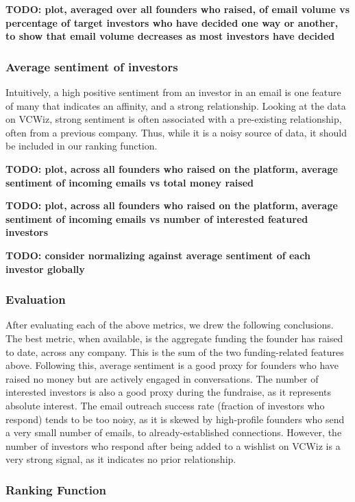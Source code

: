 \textbf{TODO: plot, averaged over all founders who raised, of email volume vs percentage of target investors who have decided one way or another, to show that email volume decreases as most investors have decided}

\subsubsection{Average sentiment of investors}

Intuitively, a high positive sentiment from an investor in an email is one feature of many that indicates an affinity, and a strong relationship. Looking at the data on VCWiz, strong sentiment is often associated with a pre-existing relationship, often from a previous company. Thus, while it is a noisy source of data, it should be included in our ranking function.

\textbf{TODO: plot, across all founders who raised on the platform, average sentiment of incoming emails vs total money raised}

\textbf{TODO: plot, across all founders who raised on the platform, average sentiment of incoming emails vs number of interested featured investors}

\textbf{TODO: consider normalizing against average sentiment of each investor globally}

\medskip

\subsubsection{Evaluation}

After evaluating each of the above metrics, we drew the following conclusions. The best metric, when available, is the aggregate funding the founder has raised to date, across any company. This is the sum of the two funding-related features above. Following this, average sentiment is a good proxy for founders who have raised no money but are actively engaged in conversations. The number of interested investors is also a good proxy during the fundraise, as it represents absolute interest. The email outreach success rate (fraction of investors who respond) tends to be too noisy, as it is skewed by high-profile founders who send a very small number of emails, to already-established connections. However, the number of investors who respond after being added to a wishlist on VCWiz is a very strong signal, as it indicates no prior relationship.

\subsubsection{Ranking Function}

